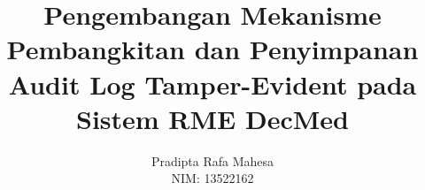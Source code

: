 \documentclass[bahasa, 12pt, a4paper, onecolumn, oneside, final]{report}
\begin{document}
\title{Pengembangan Mekanisme Pembangkitan dan Penyimpanan Audit Log Tamper-Evident pada Sistem RME DecMed
}
\date{}
\author{
	Pradipta Rafa Mahesa \\
	NIM: 13522162
}
\newcommand\tanggalpengesahan{23 September 2026}





\pagestyle{plain}



\end{document}
